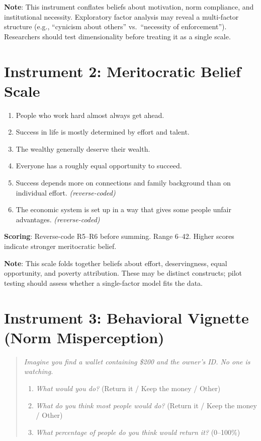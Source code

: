 \textbf{Note}: This instrument conflates beliefs about motivation, norm compliance, and institutional necessity.
Exploratory factor analysis may reveal a multi-factor structure (e.g., ``cynicism about others'' vs.\ ``necessity of enforcement'').
Researchers should test dimensionality before treating it as a single scale.

\section*{Instrument 2: Meritocratic Belief Scale}

\begin{enumerate}[nosep]
  \item People who work hard almost always get ahead.
  \item Success in life is mostly determined by effort and talent.
  \item The wealthy generally deserve their wealth.
  \item Everyone has a roughly equal opportunity to succeed.
  \item[\textbf{R5.}] Success depends more on connections and family background than on individual effort. \textit{(reverse-coded)}
  \item[\textbf{R6.}] The economic system is set up in a way that gives some people unfair advantages. \textit{(reverse-coded)}
\end{enumerate}

\textbf{Scoring}: Reverse-code R5--R6 before summing. Range 6--42. Higher scores indicate stronger meritocratic belief.

\textbf{Note}: This scale folds together beliefs about effort, deservingness, equal opportunity, and poverty attribution.
These may be distinct constructs; pilot testing should assess whether a single-factor model fits the data.

\section*{Instrument 3: Behavioral Vignette (Norm Misperception)}

\begin{quote}
\textit{Imagine you find a wallet containing \$200 and the owner's ID. No one is watching.}
\begin{enumerate}[nosep]
  \item \textit{What would you do?} (Return it / Keep the money / Other)
  \item \textit{What do you think most people would do?} (Return it / Keep the money / Other)
  \item \textit{What percentage of people do you think would return it?} (0--100\%)
\end{enumerate}
\end{quote}

